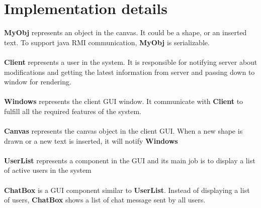 \documentclass{article}
\begin{document}
\section*{Implementation details}
\textbf{MyObj} represents an object in the canvas. It could be a shape, or an inserted text. To support java RMI communication, \textbf{MyObj} is serializable.\\\\
\textbf{Client} represents a user in the system. It is responsible for notifying server about modifications and getting the latest information from server and passing down to window for rendering.\\\\
\textbf{Windows} represents the client GUI window. It communicate with \textbf{Client} to fulfill all the required features of the system.\\\\
\textbf{Canvas} represents the canvas object in the client GUI. When a new shape is drawn or a new text is inserted, it will notify \textbf{Windows}\\\\
\textbf{UserList} represents a component in the GUI and its main job is to display a list of active users in the system\\\\
\textbf{ChatBox} is a GUI component similar to \textbf{UserList}. Instead of displaying a list of users, \textbf{ChatBox} shows a list of chat message sent by all users.
\end{document}
